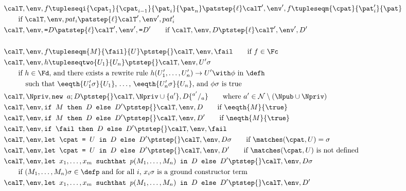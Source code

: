 \documentclass{book}
\begin{document}
\begin{figure}[p]
\begin{align*}
&\calT, \env, f\tupleseqi{\cpat_1}{\cpat_{i-1}}{\pat_i}{\pat_n} \patstep{\ell} \calT',\env',f\tupleseqm{\cpat}{\pat'_i}{\pat}\\
&\qquad\text{if } \calT, \env, pat_i \patstep{\ell} \calT',\env',pat'_i\\
&\calT, \env, \texttt{=}D \patstep{\ell} \calT',\env',\texttt{=}D'\qquad\text{if } \calT, \env, D \ptstep{\ell} \calT',\env',D'\\
&\\
&\calT, \env, f\tupleseqm{M}{\fail}{U} \ptstep{} \calT, \env, \fail\qquad\text{if $f \in \Fc$}\\
&\calT, \env, h\tupleseqtwo{U_1}{U_n} \ptstep{} \calT, \env, U'\sigma\\
&\qquad\text{if $h \in \Fd$, and there exists a rewrite rule $h(U'_1, \dots, U'_n) \rightarrow U' \with \phi$ in $\defh$} \\
&\qquad\quad\text{such that $\eeqth{U'_1\sigma}{U_1}$, \dots, $\eeqth{U'_n\sigma}{U_n}$, and $\phi \sigma$ is true}\\
&\calT, \Npriv, \texttt{new } a; D \ptstep{} \calT, \Npriv \cup \{ a' \}, D\{^{a'}/_a\}\qquad\text{where } a' \in \cal N \setminus (\Npub \cup \Npriv)\\
&\calT, \env, \texttt{if } M \texttt{ then } D \texttt{ else } D' \ptstep{} \calT, \env, D \qquad\text{if $\eeqth{M}{\true}$}\\
&\calT, \env, \texttt{if } M \texttt{ then } D \texttt{ else } D' \ptstep{} \calT, \env, D' \qquad\text{if $\neqth{M}{\true}$}\\
&\calT, \env, \texttt{if } \fail \texttt{ then } D \texttt{ else } D' \ptstep{} \calT, \env, \fail\\
&\calT, \env, \texttt{let } \cpat \texttt{ = } U \texttt{ in } D \texttt{ else } D' \ptstep{} \calT, \env, D\sigma\qquad\text{if $\matches(\cpat,U) = \sigma$}\\
&\calT, \env, \texttt{let } \cpat \texttt{ = } U \texttt{ in } D \texttt{ else } D' \ptstep{} \calT, \env, D' \qquad\text{if $\matches(\cpat,U)$ is not defined}\\
&\calT, \env, \texttt{let } x_1,\ldots,x_m \texttt{ suchthat } p(M_1,\ldots,M_n) \texttt{ in } D \texttt{ else } D' \ptstep{} \calT, \env, D\sigma\\
&\qquad\text{if $(M_1,\ldots,M_n)\sigma \in \defp$ and for all $i$, $x_i\sigma$ is a ground constructor term}\\
&\calT, \env, \texttt{let } x_1,\ldots,x_m \texttt{ suchthat } p(M_1,\ldots,M_n) \texttt{ in } D \texttt{ else } D' \ptstep{} \calT, \env, D'\\

\end{align*}
\end{figure}
\end{document}
